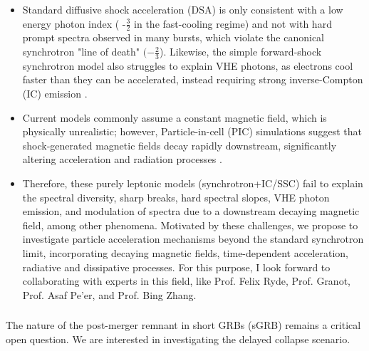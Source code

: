 \begin{itemize}
    \itemsep0em 
    \item Standard diffusive shock acceleration (DSA) is only consistent with a low energy photon index ( -$\frac{3}{2}$ in the fast-cooling regime) and not with hard prompt spectra observed in many bursts, which violate the canonical synchrotron "line of death" $(-\frac{2}{3}$). Likewise, the simple forward-shock synchrotron model also struggles to explain VHE photons, as electrons cool faster than they can be accelerated, instead requiring strong inverse-Compton (IC) emission \cite{gill2022gammarayburststevenergies}. 
    \item Current models commonly assume a constant magnetic field, which is physically unrealistic; however, Particle-in-cell (PIC) simulations suggest that shock-generated magnetic fields decay rapidly downstream, significantly altering acceleration and radiation processes \cite{Ryde_2022}.
    
    \item Therefore, these purely leptonic models (synchrotron+IC/SSC) fail to explain the spectral diversity, sharp breaks, hard spectral slopes, VHE photon emission, and modulation of spectra due to a downstream decaying magnetic field, among other phenomena. Motivated by these challenges, we propose to investigate particle acceleration mechanisms beyond the standard synchrotron limit, incorporating decaying magnetic fields, time-dependent acceleration, radiative and dissipative processes. For this purpose, I look forward to collaborating with experts in this field, like Prof. Felix Ryde, Prof. Granot, Prof. Asaf Pe’er, and Prof. Bing Zhang.
\end{itemize}

\subsubsection*{\fontsize{11.5 pt}{10 pt}\selectfont{Central Engine Dynamics and Quasi-Periodic Oscillations (QPOs) :}}
The nature of the post-merger remnant in short GRBs (sGRB) remains a critical open question. We are interested in investigating the delayed collapse scenario.

